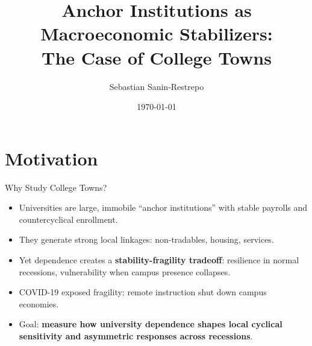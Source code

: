 \documentclass[10pt,compress]{beamer}
\title[Texas A\&M University]{Anchor Institutions as Macroeconomic Stabilizers:\\The Case of College Towns}
\author [Sanin-Restrepo]{Sebastian Sanin-Restrepo}
\date[ \today]{\today}
\institute[Texas A\&M U.] %
{Public Economics \\
 }
\begin{document}
\begin{frame}
\titlepage
\end{frame}


\section{Motivation}

\begin{frame}{Why Study College Towns?}
	\begin{itemize}
		\item Universities are large, immobile “anchor institutions” with stable payrolls and countercyclical enrollment.
		\item They generate strong local linkages: non-tradables, housing, services.
		\item Yet dependence creates a \textbf{stability-fragility tradeoff}: resilience in normal recessions, vulnerability when campus presence collapses.
		\item COVID-19 exposed fragility: remote instruction shut down campus economies.
		\item Goal: \textbf{measure how university dependence shapes local cyclical sensitivity and asymmetric responses across recessions}.
	\end{itemize}
\end{frame}
\end{document}
